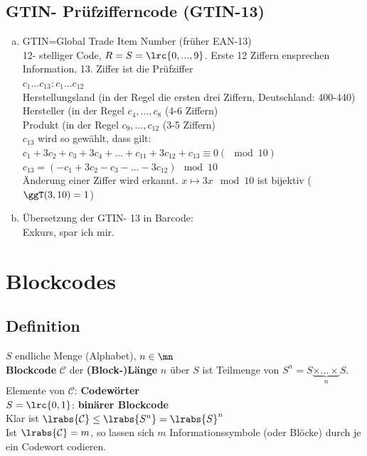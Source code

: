 	\subsection{GTIN- Prüfzifferncode (GTIN-13)}
		\begin{enumerate}[a)]
			\item GTIN=Global Trade Item Number (früher EAN-13)\\
				12- stelliger Code, $R=S=\lrc{0,...,9}$. Erste 12 Ziffern ensprechen
				Information, 13. Ziffer ist die Prüfziffer\\
				$c_1...c_{13}:c_1...c_{12}$\\
				Herstellungsland (in der Regel die ersten drei Ziffern, Deutschland: 400-440)\\
				Hersteller (in der Regel $c_4,...,c_8$ (4-6 Ziffern)\\
				Produkt (in der Regel $c_9,...,c_{12}$ (3-5 Ziffern)\\
				$c_{13}$ wird so gewählt, dass gilt:
				$c_1+3c_2+c_3+3c_4+...+c_{11}+3c_{12}+c_{13}\equiv 0(\mod 10)$\\
				$c_{13}=(-c_1+3c_2-c_3-...-3c_12)\mod 10$\\
				Änderung einer Ziffer wird erkannt. $x\mapsto 3x\mod 10$ ist bijektiv
				($\ggT(3,10)=1$)
			\item Übersetzung der GTIN- 13 in Barcode:\\
				Exkurs, spar ich mir.
		\end{enumerate}

\section{Blockcodes}
	\subsection{Definition}
		$S$ endliche Menge (Alphabet), $n\in\mn$\\
		\textbf{Blockcode} $\mathcal{C}$ der \textbf{(Block-)Länge} $n$ über $S$ ist Teilmenge von $S^n=S\underbrace{\times\dots\times}_{n}S$.\\
		Elemente von $\mathcal{C}$: \textbf{Codewörter}\\
		$S=\lrc{0,1}$: \textbf{binärer Blockcode}\\
		Klar ist $\lrabs{\mathcal{C}}\leq\lrabs{S^n}=\lrabs{S}^n$\\
		Ist $\lrabs{\mathcal{C}}=m$, so lassen sich $m$ Informationssymbole (oder Blöcke) durch je ein Codewort codieren.
	

